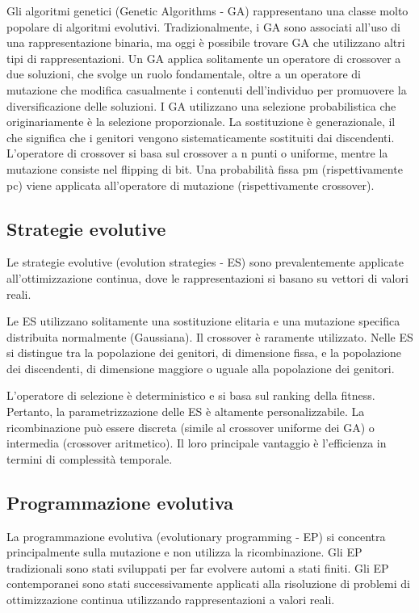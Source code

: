 Gli algoritmi genetici (Genetic Algorithms - GA) rappresentano una classe molto popolare di algoritmi evolutivi. Tradizionalmente, i GA sono associati all'uso di una rappresentazione binaria, ma oggi è possibile trovare GA che utilizzano altri tipi di rappresentazioni. Un GA applica solitamente un operatore di crossover a due soluzioni, che svolge un ruolo fondamentale, oltre a un operatore di mutazione che modifica casualmente i contenuti dell'individuo per promuovere la diversificazione delle soluzioni. I GA utilizzano una selezione probabilistica che originariamente è la selezione proporzionale. La sostituzione è generazionale, il che significa che i genitori vengono sistematicamente sostituiti dai discendenti. L'operatore di crossover si basa sul crossover a n punti o uniforme, mentre la mutazione consiste nel flipping di bit. Una probabilità fissa pm (rispettivamente pc) viene applicata all'operatore di mutazione (rispettivamente crossover).

\subsection{Strategie evolutive}

Le strategie evolutive (evolution strategies - ES) sono prevalentemente applicate all'ottimizzazione continua, dove le rappresentazioni si basano su vettori di valori reali.

Le ES utilizzano solitamente una sostituzione elitaria e una mutazione specifica distribuita normalmente (Gaussiana). Il crossover è raramente utilizzato. Nelle ES si distingue tra la popolazione dei genitori, di dimensione fissa, e la popolazione dei discendenti, di dimensione maggiore o uguale alla popolazione dei genitori. 

L'operatore di selezione è deterministico e si basa sul ranking della fitness. Pertanto, la parametrizzazione delle ES è altamente personalizzabile. La ricombinazione può essere discreta (simile al crossover uniforme dei GA) o intermedia (crossover aritmetico). Il loro principale vantaggio è l'efficienza in termini di complessità temporale.

\subsection{Programmazione evolutiva}

La programmazione evolutiva (evolutionary programming - EP) si concentra principalmente sulla mutazione e non utilizza la ricombinazione. Gli EP tradizionali sono stati sviluppati per far evolvere automi a stati finiti. Gli EP contemporanei sono stati successivamente applicati alla risoluzione di problemi di ottimizzazione continua utilizzando rappresentazioni a valori reali.

